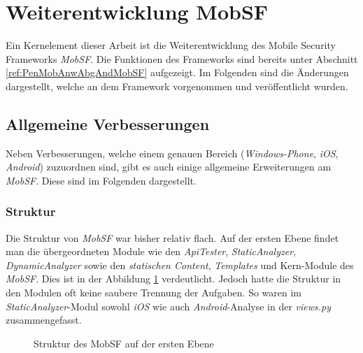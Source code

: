 \section{Weiterentwicklung MobSF}
\label{Weiterentwicklung MobSF}
Ein Kernelement dieser Arbeit ist die Weiterentwicklung des Mobile Security Frameworks \textit{MobSF}. Die Funktionen des Frameworks sind bereits unter Abschnitt \ref{ref:PenMobAnwAbgAndMobSF} aufgezeigt. Im Folgenden sind die Änderungen dargestellt, welche an dem Framework vorgenommen und veröffentlicht wurden.

\subsection{Allgemeine Verbesserungen}
Neben Verbesserungen, welche einem genauen Bereich (\textit{Windows-Phone}, \textit{iOS}, \textit{Android}) zuzuordnen sind, gibt es auch einige allgemeine Erweiterungen am \textit{MobSF}. Diese sind im Folgenden dargestellt.

\subsubsection{Struktur}
Die Struktur von \textit{MobSF} war bisher relativ flach. Auf der ersten Ebene findet man die übergeordneten Module wie den \textit{ApiTester}, \textit{StaticAnalyzer}, \textit{DynamicAnalyzer} sowie den \textit{statischen Content}, \textit{Templates} und Kern-Module des \textit{MobSF}. Dies ist in der Abbildung \ref{fig:MobSFStrukOrig} verdeutlicht. Jedoch hatte die Struktur in den Modulen oft keine saubere Trennung der Aufgaben. So waren im \textit{StaticAnalyzer}-Modul sowohl \textit{iOS} wie auch \textit{Android}-Analyse in der \textit{views.py} zusammengefasst.\\

\begin{figure}[htbp]
\caption{Struktur des MobSF auf der ersten Ebene}
\label{fig:MobSFStrukOrig}
\end{figure}

